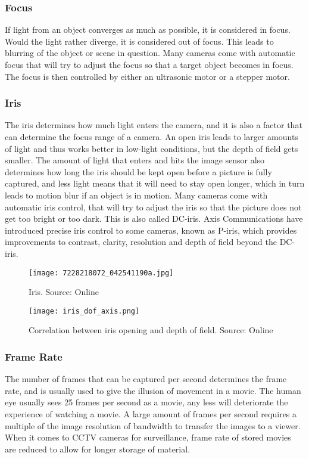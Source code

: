 \subsubsection{Focus}
If light from an object converges as much as possible, it is considered in focus. Would the light rather diverge, it is considered out of focus. This leads to blurring of the object or scene in question.
Many cameras come with automatic focus that will try to adjust the focus so that a target object becomes in focus. The focus is then controlled by either an ultrasonic motor or a stepper motor.

\subsubsection{Iris}
The iris determines how much light enters the camera, and it is also a factor that can determine the focus range of a camera. An open iris leads to larger amounts of light and thus works better in low-light conditions, but the depth of field gets smaller.
The amount of light that enters and hits the image sensor also determines how long the iris should be kept open before a picture is fully captured, and less light means that it will need to stay open longer, which in turn leads to motion blur if an object is in motion.
Many cameras come with automatic iris control, that will try to adjust the iris so that the picture does not get too bright or too dark. This is also called DC-iris.
Axis Communications have introduced precise iris control to some cameras, known as P-iris, which provides improvements to contrast, clarity, resolution and depth of field beyond the DC-iris.

\begin{figure}[ht]
    \centering
    \texttt{[image: 7228218072\_042541190a.jpg]}
    \caption{Iris. Source: Online \citet{iris15}}
    \label{fig:7228218072_042541190a}
\end{figure}
\FloatBarrier

\begin{figure}[ht]
    \centering
    \texttt{[image: iris\_dof\_axis.png]}
    \caption{Correlation between iris opening and depth of field. Source: Online \citet{axispiris15}}
    \label{fig:iris_dof_axis}
\end{figure}
\FloatBarrier

\subsubsection{Frame Rate}
The number of frames that can be captured per second determines the frame rate, and is usually used to give the illusion of movement in a movie. The human eye usually sees 25 frames per second as a movie, any less will deteriorate the experience of watching a movie.
A large amount of frames per second requires a multiple of the image resolution of bandwidth to transfer the images to a viewer.
When it comes to CCTV cameras for surveillance, frame rate of stored movies are reduced to allow for longer storage of material. 


